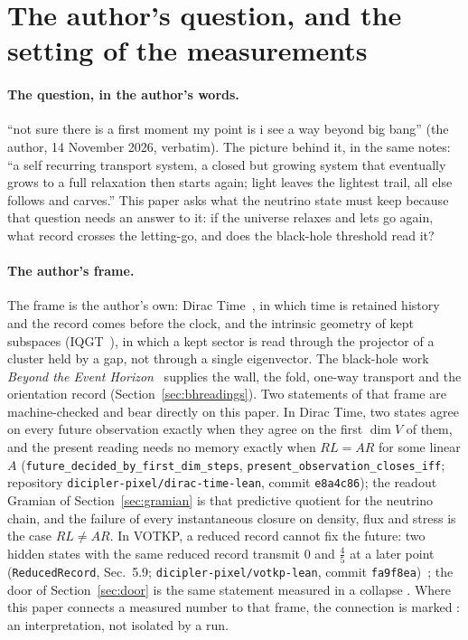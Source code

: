 \section{The author's question, and the setting of the measurements}\label{sec:frame}

\paragraph{The question, in the author's words.} ``not sure there is a first moment my point is i see a way beyond big bang'' (the author, 14 November 2026, verbatim). The picture behind it, in the same notes: ``a self recurring transport system, a closed but growing system that eventually grows to a full relaxation then starts again; light leaves the lightest trail, all else follows and carves.'' This paper asks what the neutrino state must keep because that question needs an answer to it: if the universe relaxes and lets go again, what record crosses the letting-go, and does the black-hole threshold read it?

\paragraph{The author's frame.} The frame is the author's own: Dirac Time~\cite{DT}, in which time is retained history and the record comes before the clock, and the intrinsic geometry of kept subspaces (IQGT~\cite{IQGT}), in which a kept sector is read through the projector of a cluster held by a gap, not through a single eigenvector. The black-hole work \emph{Beyond the Event Horizon}~\cite{BH} supplies the wall, the fold, one-way transport and the orientation record (Section~\ref{sec:bhreadings}). Two statements of that frame are machine-checked and bear directly on this paper. In Dirac Time, two states agree on every future observation exactly when they agree on the first $\dim V$ of them, and the present reading needs no memory exactly when $RL=AR$ for some linear $A$ (\texttt{future\_decided\_by\_first\_dim\_steps}, \texttt{present\_observation\_closes\_iff}; repository \texttt{dicipler-pixel/dirac-time-lean}, commit \texttt{e8a4c86}); the readout Gramian of Section~\ref{sec:gramian} is that predictive quotient for the neutrino chain, and the failure of every instantaneous closure on density, flux and stress is the case $RL\ne AR$. In VOTKP, a reduced record cannot fix the future: two hidden states with the same reduced record transmit $0$ and $\tfrac45$ at a later point (\texttt{ReducedRecord}, Sec.~5.9; \texttt{dicipler-pixel/votkp-lean}, commit \texttt{fa9f8ea})~\cite{VOTKP}; the door of Section~\ref{sec:door} is the same statement measured in a collapse . Where this paper connects a measured number to that frame, the connection is marked : an interpretation, not isolated by a run.

